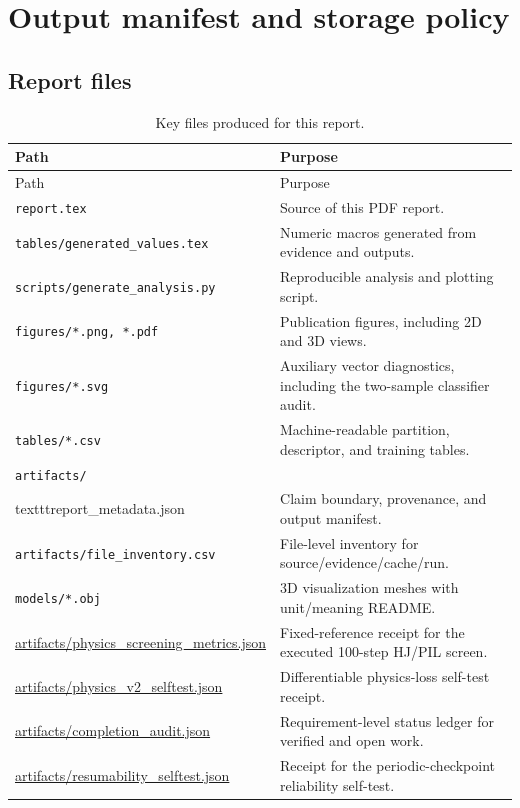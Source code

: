 \documentclass[11pt,oneside]{report}
\begin{document}
\chapter{Output manifest and storage policy}

\section{Report files}

\begin{longtable}{p{}p{}}
\caption{Key files produced for this report.}\label{tab:files}\\
\toprule
Path & Purpose \\
\midrule
\endfirsthead
\toprule
Path & Purpose \\
\midrule
\endhead
\texttt{report.tex} & Source of this PDF report. \\
\texttt{tables/generated\_values.tex} & Numeric macros generated from evidence and outputs. \\
\texttt{scripts/generate\_analysis.py} & Reproducible analysis and plotting script. \\
\texttt{figures/*.png, *.pdf} & Publication figures, including 2D and 3D views. \\
\texttt{figures/*.svg} & Auxiliary vector diagnostics, including the two-sample classifier audit. \\
\texttt{tables/*.csv} & Machine-readable partition, descriptor, and training tables. \\
\texttt{artifacts/}\\texttt{report\_metadata.json} & Claim boundary, provenance, and output manifest. \\
\texttt{artifacts/file\_inventory.csv} & File-level inventory for source/evidence/cache/run. \\
\texttt{models/*.obj} & 3D visualization meshes with unit/meaning README. \\
\url{artifacts/physics_screening_metrics.json} & Fixed-reference receipt for the executed 100-step HJ/PIL screen. \\
\url{artifacts/physics_v2_selftest.json} & Differentiable physics-loss self-test receipt. \\
\url{artifacts/completion_audit.json} & Requirement-level status ledger for verified and open work. \\
\url{artifacts/resumability_selftest.json} & Receipt for the periodic-checkpoint reliability self-test. \\

\end{longtable}
\end{document}
